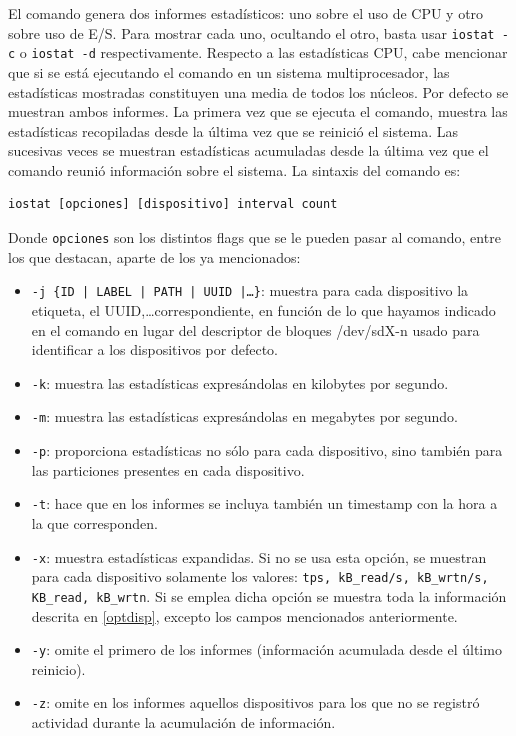 \documentclass[a4paper,10pt]{article}
\begin{document}
El comando genera dos informes estadísticos: uno sobre el uso de CPU y otro sobre uso de E/S. Para mostrar cada uno, ocultando
el otro, basta usar \texttt{iostat -c} o \texttt{iostat -d} respectivamente. Respecto a las estadísticas CPU, cabe mencionar
que si se está ejecutando el comando en un sistema multiprocesador, las estadísticas mostradas constituyen una media de todos
los núcleos. Por defecto se muestran ambos informes. La primera vez que se ejecuta el comando, muestra las estadísticas 
recopiladas desde la última vez que se reinició el sistema. Las sucesivas veces se muestran estadísticas acumuladas desde la
última vez que el comando reunió información sobre el sistema. La sintaxis del comando es:

  \begin{lstlisting}[style=BashInputStyle]
  iostat [opciones] [dispositivo] interval count
  \end{lstlisting}
  
  Donde \texttt{opciones} son los distintos flags que se le pueden pasar al comando, entre los que destacan, aparte de los ya
  mencionados:
  
  \begin{itemize}
   \item \texttt{-j \{ID | LABEL | PATH | UUID |\ldots\}}: muestra para cada dispositivo la etiqueta, el UUID,\ldots correspondiente,
   en función de lo que hayamos indicado en el comando en lugar del descriptor de bloques /dev/sdX-n usado para identificar a los dispositivos
   por defecto.
   \item \texttt{-k}: muestra las estadísticas expresándolas en kilobytes por segundo.
   \item \texttt{-m}: muestra las estadísticas expresándolas en megabytes por segundo.
   \item \texttt{-p}: proporciona estadísticas no sólo para cada dispositivo, sino también para las particiones presentes en cada
   dispositivo.
   \item \texttt{-t}: hace que en los informes se incluya también un timestamp con la hora a la que corresponden.
   \item \texttt{-x}: muestra estadísticas expandidas. Si no se usa esta opción, se muestran para cada dispositivo solamente
   los valores: \texttt{tps, kB\_read/s, kB\_wrtn/s, KB\_read, kB\_wrtn}. Si se emplea dicha opción se muestra toda la
   información descrita en \ref{optdisp}, excepto los campos mencionados anteriormente.
   \item \texttt{-y}: omite el primero de los informes (información acumulada desde el último reinicio).
   \item \texttt{-z}: omite en los informes aquellos dispositivos para los que no se registró actividad durante la acumulación
   de información.
  \end{itemize}
\end{document}

